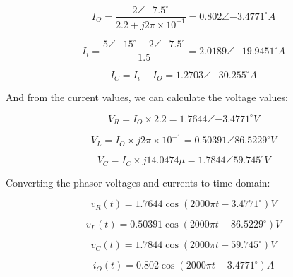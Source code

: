 \begin{equation}\label{eq:current-out}
    I_O = \frac{2\angle{-7.5^{\circ}}}{2.2 + j 2\pi \times 10^{-1}} = 0.802 \angle{-3.4771^{\circ}} A
\end{equation}

\begin{equation}\label{eq:current-in}
    I_i = \frac{5\angle{-15^{\circ}} - 2\angle{-7.5^{\circ}}}{1.5} = 2.0189 \angle{-19.9451^{\circ}} A
\end{equation}

\begin{equation}\label{eq:current-capacitor}
    I_C = I_i - I_O = 1.2703\angle{-30.255^{\circ}} A
\end{equation}

And from the current values, we can calculate the voltage values:

\begin{equation}\label{eq:voltage-resistor}
    V_R = I_O \times 2.2 = 1.7644 \angle{-3.4771^{\circ}} V
\end{equation}

\begin{equation}\label{eq:voltage-inductor}
    V_L = I_O \times j 2\pi \times 10^{-1} = 0.50391 \angle{86.5229^{\circ}} V
\end{equation}

\begin{equation}\label{eq:voltage-capacitor}
    V_C = I_C \times j14.0474\mu = 1.7844\angle{59.745^{\circ}}V
\end{equation}

\newpage
\thispagestyle{plain}

Converting the phasor voltages and currents to time domain:

\begin{equation}\label{eq:voltage-resistor-time}
    v_R(t) = 1.7644 \cos(2000\pi t - 3.4771^{\circ}) V
\end{equation}

\begin{equation}\label{eq:voltage-inductor-time}
    v_L(t) = 0.50391 \cos(2000\pi t + 86.5229^{\circ}) V
\end{equation}

\begin{equation}\label{eq:voltage-capacitor-time}
    v_C(t) = 1.7844 \cos(2000\pi t + 59.745^{\circ}) V
\end{equation}

\begin{equation}\label{eq:current-out-time}
    i_O(t) = 0.802 \cos(2000\pi t - 3.4771^{\circ}) A
\end{equation}

